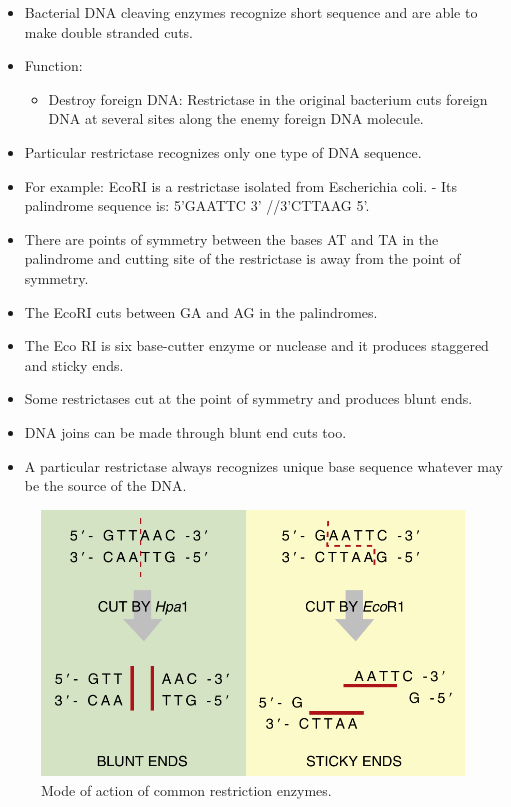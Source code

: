 \documentclass[11pt,dvipsnames,ignorenonframetext,aspectratio=169]{beamer}
\providecommand{\tightlist}{%
  \setlength{\itemsep}{0pt}\setlength{\parskip}{0pt}}
\begin{document}
\begin{frame}{}
\protect\hypertarget{section-8}{}
\begin{itemize}
\tightlist
\item
  Bacterial DNA cleaving enzymes recognize short sequence and are able
  to make double stranded cuts.
\item
  Function:

  \begin{itemize}
  \tightlist
  \item
    Destroy foreign DNA: Restrictase in the original bacterium cuts
    foreign DNA at several sites along the enemy foreign DNA molecule.
  \end{itemize}
\item
  Particular restrictase recognizes only one type of DNA sequence.
\item
  For example: EcoRI is a restrictase isolated from Escherichia coli. -
  Its palindrome sequence is: 5'GAATTC 3' //3'CTTAAG 5'.
\end{itemize}
\end{frame}

\begin{frame}{}
\protect\hypertarget{section-9}{}
\begin{itemize}
\tightlist
\item
  There are points of symmetry between the bases AT and TA in the
  palindrome and cutting site of the restrictase is away from the point
  of symmetry.
\item
  The EcoRI cuts between GA and AG in the palindromes.
\item
  The Eco RI is six base-cutter enzyme or nuclease and it produces
  staggered and sticky ends.
\item
  Some restrictases cut at the point of symmetry and produces blunt
  ends.
\item
  DNA joins can be made through blunt end cuts too.
\item
  A particular restrictase always recognizes unique base sequence
  whatever may be the source of the DNA.
\end{itemize}
\end{frame}

\begin{frame}{}
\protect\hypertarget{section-10}{}
\begin{figure}
\includegraphics[width=0.45\linewidth]{./../images/restriction_enzymes} \caption{Mode of action of common restriction enzymes.}\label{fig:restriction-enzymes}
\end{figure}
\end{frame}
\end{document}
